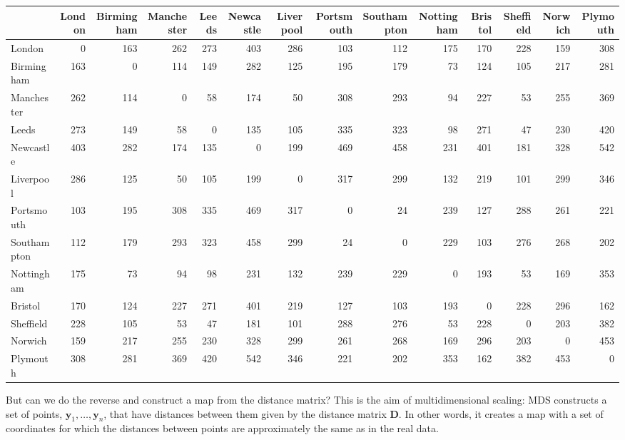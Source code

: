 \documentclass[
]{book}
\theoremstyle{definition}
\theoremstyle{definition}
\theoremstyle{definition}
\theoremstyle{definition}
\theoremstyle{remark}
\begin{document}
\begin{table}
\centering\begingroup\fontsize{7}{9}\selectfont

\begin{tabular}{lrrrrrrrrrrrrr}
\toprule
  & London & Birmingham & Manchester & Leeds & Newcastle & Liverpool & Portsmouth & Southampton & Nottingham & Bristol & Sheffield & Norwich & Plymouth\\
\midrule
London & 0 & 163 & 262 & 273 & 403 & 286 & 103 & 112 & 175 & 170 & 228 & 159 & 308\\
Birmingham & 163 & 0 & 114 & 149 & 282 & 125 & 195 & 179 & 73 & 124 & 105 & 217 & 281\\
Manchester & 262 & 114 & 0 & 58 & 174 & 50 & 308 & 293 & 94 & 227 & 53 & 255 & 369\\
Leeds & 273 & 149 & 58 & 0 & 135 & 105 & 335 & 323 & 98 & 271 & 47 & 230 & 420\\
Newcastle & 403 & 282 & 174 & 135 & 0 & 199 & 469 & 458 & 231 & 401 & 181 & 328 & 542\\
\addlinespace
Liverpool & 286 & 125 & 50 & 105 & 199 & 0 & 317 & 299 & 132 & 219 & 101 & 299 & 346\\
Portsmouth & 103 & 195 & 308 & 335 & 469 & 317 & 0 & 24 & 239 & 127 & 288 & 261 & 221\\
Southampton & 112 & 179 & 293 & 323 & 458 & 299 & 24 & 0 & 229 & 103 & 276 & 268 & 202\\
Nottingham & 175 & 73 & 94 & 98 & 231 & 132 & 239 & 229 & 0 & 193 & 53 & 169 & 353\\
Bristol & 170 & 124 & 227 & 271 & 401 & 219 & 127 & 103 & 193 & 0 & 228 & 296 & 162\\
\addlinespace
Sheffield & 228 & 105 & 53 & 47 & 181 & 101 & 288 & 276 & 53 & 228 & 0 & 203 & 382\\
Norwich & 159 & 217 & 255 & 230 & 328 & 299 & 261 & 268 & 169 & 296 & 203 & 0 & 453\\
Plymouth & 308 & 281 & 369 & 420 & 542 & 346 & 221 & 202 & 353 & 162 & 382 & 453 & 0\\
\bottomrule
\end{tabular}
\endgroup{}
\end{table}

But can we do the reverse and construct a map from the distance matrix? This is the aim of multidimensional scaling:
MDS constructs a set of points, \(\mathbf y_1, \ldots, \mathbf y_n\), that have distances between them given by the distance matrix \(\mathbf D\). In other words, it creates a map with a set of coordinates for which the distances between points are approximately the same as in the real data.
\end{document}
